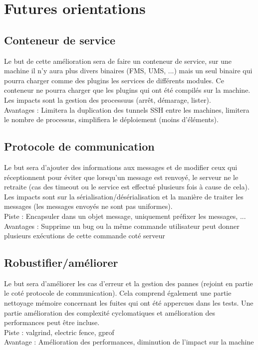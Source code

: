\documentclass{article}
\begin{document}
\section{Futures orientations}

\subsection{Conteneur de service}
Le but de cette amélioration sera de faire un conteneur
de service, sur une machine il n'y aura plus divers binaires (FMS, UMS, ...) mais un
seul binaire qui pourra charger comme des plugins les services de différents modules.
Ce conteneur ne pourra charger que les plugins qui ont été compilés sur la machine. \\
Les impacts sont la gestion des processuus (arrêt, démarage, lister).\\
Avantages : Limitera la duplication des tunnels SSH entre les machines, limitera le
nombre de processus, simplifiera le déploiement (moins d'éléments).

\subsection{Protocole de communication}
Le but sera d'ajouter des informations aux messages et de modifier ceux qui réceptionnent
pour éviter que lorsqu'un message est renvoyé, le serveur ne le retraite (cas des timeout
ou le service est effectué plusieurs fois à cause de cela). \\
Les impacts sont sur la sérialisation/désérialisation et la manière de traiter les messages
(les messages envoyés ne sont pas uniformes). \\
Piste : Encapsuler dans un objet message, uniquement préfixer les messages, ... \\
Avantages : Supprime un bug ou la même commande utilisateur peut donner plusieurs 
exécutions de cette commande coté serveur

\subsection{Robustifier/améliorer}
Le but sera d'améliorer les cas d'erreur et la gestion des pannes (rejoint en partie
le coté protocole de communication). Cela comprend également une partie nettoyage mémoire
concernant les fuites qui ont été appercues dans les tests. Une partie amélioration des
complexité cyclomatiques et amélioration des performances peut être incluse.\\
Piste : valgrind, electric fence, gprof \\
Avantage : Amélioration des performances, diminution de l'impact sur la machine
\end{document}
